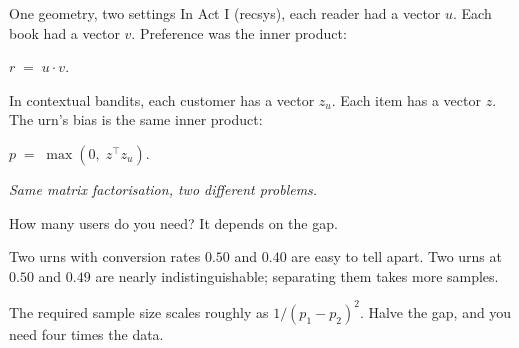 \begin{frame}{One geometry, two settings}
  In Act I (recsys), each reader had a vector $u$.  Each book had a
  vector $v$.  Preference was the inner product:
  \begin{center}
    $r \;=\; u \cdot v.$
  \end{center}

  \smallskip
  In contextual bandits, each customer has a vector $z_u$.  Each item
  has a vector $z$.  The urn's bias is the same inner product:
  \begin{center}
    $p \;=\; \max(0,\; z^\top z_u).$
  \end{center}

  \smallskip
  \begin{center}
    \itshape\color{mutedWarmGray}
    Same matrix factorisation, two different problems.
  \end{center}
\end{frame}

\begin{frame}{How many users do you need?}
  It depends on the gap.

  \medskip

  Two urns with conversion rates $0.50$ and $0.40$ are easy to tell apart.
  Two urns at $0.50$ and $0.49$ are nearly indistinguishable;
  separating them takes  more samples.

  \medskip

  The required sample size scales roughly as $1 / (p_1 - p_2)^2$.
  Halve the gap, and you need four times the data.
\end{frame}



